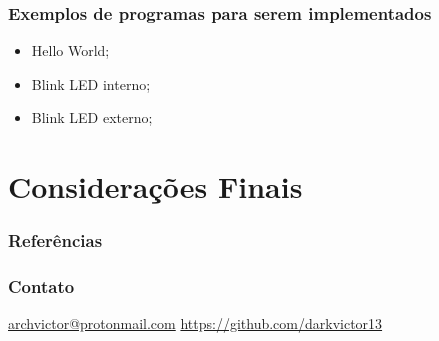 \documentclass[12pt]{beamer}
\begin{document}
\begin{frame}
    \frametitle{Exemplos de programas para serem implementados}

    \begin{itemize}
        \item Hello World;
        \item Blink LED interno;
        \item Blink LED externo;
    \end{itemize}

\end{frame}

\section{Considerações Finais}
\begin{frame}[allowframebreaks]
    \frametitle{Referências}
    
\end{frame}

\begin{frame}
    \frametitle{Contato}
    \centering
    \url{archvictor@protonmail.com}
    \url{https://github.com/darkvictor13}
\end{frame}
\end{document}
